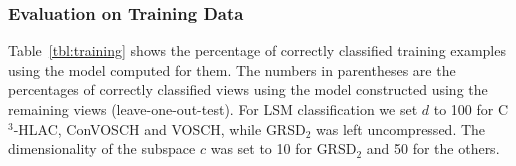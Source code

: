 \documentclass[a4paper, 10 pt, conference]{sty/ieeeconf}
\begin{document}


\subsubsection{Evaluation on Training Data}
Table~\ref{tbl:training} shows the percentage of correctly classified training examples using the model computed for them.
The numbers in parentheses are the percentages of correctly classified views using the model constructed using the remaining views
(leave-one-out-test).
For LSM classification we set $d$ to 
100 for C$^3$-HLAC, ConVOSCH and VOSCH, while GRSD$_2$ was left uncompressed. 
The dimensionality of the subspace $c$ was set to 10 for GRSD$_2$ and 50 for the others.

\end{document}
